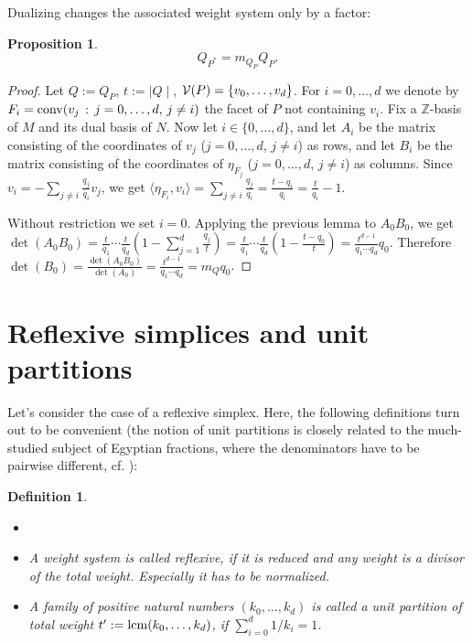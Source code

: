 \documentclass[a4paper,twoside]{article}
\newcommand{\card}[1]{{\mid\! #1 \!\mid}}
\newcommand{\pro}[2]{\langle #1, #2 \rangle}
\def\Z{{\mathbb Z}}
\def\lcm{{\rm lcm}}
\def\V{{{\cal V}}}
\def\conv{{\rm conv}}
\newtheorem{definition}[theorem]{Definition}
\newtheorem{proposition}[theorem]{Proposition}
\begin{document}
Dualizing changes the associated weight system only by a factor:

\begin{proposition}
\[Q_{P^*} = m_{Q_P} Q_P.\]
\label{formula}
\end{proposition}

\begin{proof}

Let $Q := Q_P$, $t := \card{Q}$, 
$\V(P) = \{v_0, \ldots, v_d\}$. For $i = 0, \ldots, d$ we denote by $F_i = \conv(v_j \,:\, j = 0, \ldots, d, \, j \not=i)$ the facet of $P$ not 
containing $v_i$. 
Fix a $\Z$-basis of $M$ and its dual basis of $N$. 
Now let $i \in \{0, \ldots, d\}$, and let $A_i$ be the matrix consisting of 
the coordinates of $v_j$ ($j=0, \ldots, d$, $j\not=i$) as rows, and let 
$B_i$  be the matrix consisting of 
the coordinates of $\eta_{F_j}$ ($j=0, \ldots, d$, $j\not=i$) as columns. 
Since $v_i = -\sum_{j\not=i} \frac{q_j}{q_i} v_j$, we get $\pro{\eta_{F_i}}{v_i} = 
\sum_{j\not=i} \frac{q_j}{q_i} = \frac{t-q_i}{q_i} = \frac{t}{q_i} - 1$. 

Without restriction we set $i=0$. Applying the previous lemma to $A_0 B_0$, we get 
$\det(A_0 B_0) = \frac{t}{q_1} \cdots \frac{t}{q_d} (1 - \sum_{j=1}^d \frac{q_j}{t}) =
\frac{t}{q_1} \cdots \frac{t}{q_d} (1 - \frac{t-q_0}{t})
= \frac{t^{d-1}}{q_1 \cdots q_d} q_0$. 
Therefore $\det(B_0) = \frac{\det(A_0 B_0)}{\det(A_0)} = \frac{t^{d-1}}{q_1 \cdots q_d} = m_Q q_0$. 

\end{proof}

\section{Reflexive simplices and unit partitions}

Let's consider the case of a reflexive simplex. Here, the following definitions turn out to be convenient 
(the notion of unit partitions is closely related to the much-studied subject of Egyptian fractions, where the denominators 
have to be pairwise different, cf. \cite[D11]{Guy81}):

\begin{definition}{\rm 
\begin{itemize}
\item[]
\item A weight system is called {\em reflexive}, if it is reduced and any weight is a divisor of the total weight. 
Especially it has to be normalized.
\item A family of positive natural numbers $(k_0, \ldots, k_d)$ is called a {\em unit partition of total weight} 
$t' := \lcm(k_0, \ldots, k_d)$, if $\sum_{i=0}^d 1/k_i = 1$.
\end{itemize}
}
\end{definition}
\end{document}
